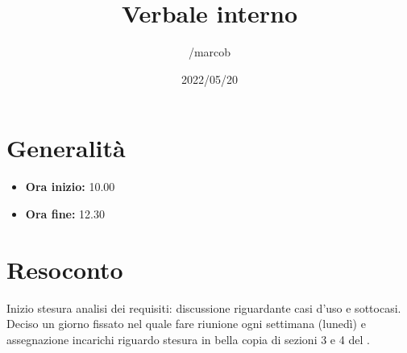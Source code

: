 \documentclass{classes/base}
\title{Verbale interno}
\date{2022/05/20}
\author{/marcob}
\renewcommand{\maketitle}{
    
}
\begin{document}
    \maketitle

    \section*{Generalità}
    \begin{itemize}
        \item \textbf{Ora inizio:} 10.00
        \item \textbf{Ora fine:} 12.30
    \end{itemize}

    \section*{Resoconto}
    Inizio stesura analisi dei requisiti: discussione riguardante casi d'uso e sottocasi.\\
    Deciso un giorno fissato nel quale fare riunione ogni settimana (lunedì) e assegnazione incarichi riguardo
    stesura in bella copia di sezioni 3 e 4 del \PdP.
\end{document}
